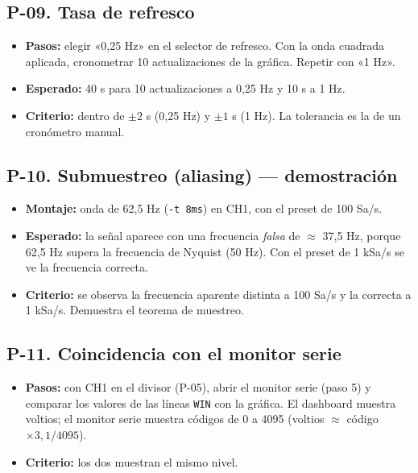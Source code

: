 \documentclass[12pt,a4paper]{article}
\begin{document}
\subsection*{P-09. Tasa de refresco}
\begin{itemize}
  \item \textbf{Pasos:} elegir «0,25 Hz» en el selector de refresco. Con la onda cuadrada aplicada, cronometrar 10 actualizaciones de la gráfica. Repetir con «1 Hz».
  \item \textbf{Esperado:} 40 s para 10 actualizaciones a 0{,}25 Hz y 10 s a 1 Hz.
  \item \textbf{Criterio:} dentro de $\pm 2$ s (0{,}25 Hz) y $\pm 1$ s (1 Hz). La tolerancia es la de un cronómetro manual.
\end{itemize}

\subsection*{P-10. Submuestreo (aliasing) --- demostración}
\begin{itemize}
  \item \textbf{Montaje:} onda de 62{,}5 Hz (\texttt{-t 8ms}) en CH1, con el preset de 100 Sa/s.
  \item \textbf{Esperado:} la señal aparece con una frecuencia \emph{falsa} de $\approx$ 37{,}5 Hz, porque 62{,}5 Hz supera la frecuencia de Nyquist (50 Hz). Con el preset de 1 kSa/s se ve la frecuencia correcta.
  \item \textbf{Criterio:} se observa la frecuencia aparente distinta a 100 Sa/s y la correcta a 1 kSa/s. Demuestra el teorema de muestreo.
\end{itemize}

\subsection*{P-11. Coincidencia con el monitor serie}
\begin{itemize}
  \item \textbf{Pasos:} con CH1 en el divisor (P-05), abrir el monitor serie (paso 5) y comparar los valores de las líneas \texttt{WIN} con la gráfica. El dashboard muestra voltios; el monitor serie muestra códigos de 0 a 4095 (voltios $\approx$ código $\times 3{,}1 / 4095$).
  \item \textbf{Criterio:} los dos muestran el mismo nivel.
\end{itemize}
\end{document}
